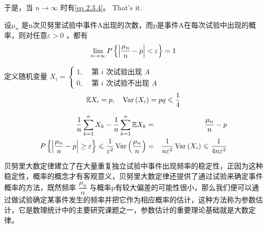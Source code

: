 \begin{enumerate}[1]
\begin{myproof}
		  于是，当 $ n \rightarrow \infty $ 时有\eqref{eq 2.3.4}。
		  That's it.
		\end{myproof}  

		\begin{mydef}[贝努里大数定律]
					设$ \mu_{n} $ 是n次贝努里试验中事件A出现的次数，而p是事件A在每次试验中出现的概率，则对任意$ \varepsilon > 0 $ ，都有
				\begin{eqnarray}
					\lim _{n \rightarrow \infty} P\left\{\left|\frac{\mu_{n}}{n}-p\right|<\varepsilon\right\}=1 \notag 
				\end{eqnarray}
	    \end{mydef}
	   	  
	   	\begin{myproof}
				 
		   定义随机变量  $X_{i}=\left\{\begin{array}{ll}1, & \text { 第 } i \text { 次试验出现 } A \\ 0, & \text { 第 } i \text { 次试验不出现 } A\end{array}\right.  $
	   	  \begin{eqnarray}
			\mathbb{E} X_{i}  = p, \quad \operatorname{Var}\left(X_{i}\right)  =  p q \leqslant \frac{1}{4} \notag
	   	  \end{eqnarray}
	   	  
	   	  \vspace{-1cm}
	   	  \begin{eqnarray}
	   	  \frac{1}{n} \sum_{k  = 1}^{n} X_{k}-\frac{1}{n} \sum_{k  =  1}^{n} \mathbb{E} X_{k} & = & \frac{\mu_{n}}{n}-p \notag \\
			 P\left\{\left|\frac{\mu_{n}}{n}-p\right| \geq \varepsilon\right\} \leqslant \frac{1}{\varepsilon^{2}} \operatorname{Var}
			 \left(\frac{\mu_{n}}{n}\right) &  = &\frac{1}{n \varepsilon^{2}} \operatorname{Var}\left(X_{i}\right) \leqslant \frac{1}{4 n \varepsilon^{2}} \notag
	   	  \end{eqnarray}
		\end{myproof}

	   	  贝努里大数定律建立了在大量重复独立试验中事件出现频率的稳定性，正因为这种稳定性，概率的概念才有客观意义，贝努里大数定律还提供了通过试验来确定事件概率的方法，既然频率 $ \dfrac{\mu_{n}}{n} $ 与概率p有较大偏差的可能性很小，那么我们便可以通过做试验确定某事件发生的频率并把它作为相应概率的估计，这种方法称为参数估计，它是数理统计中的主要研究课题之一，参数估计的重要理论基础就是大数定律。
	   	  
	\end{enumerate}

